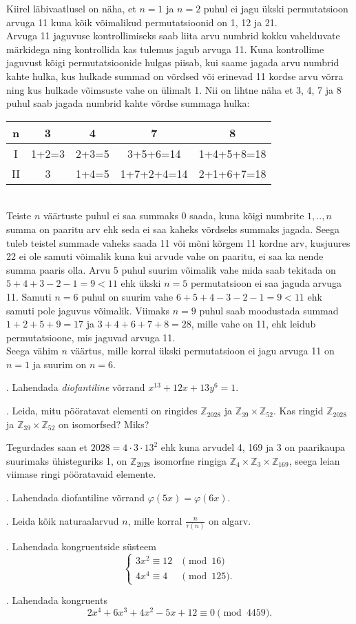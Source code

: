 \documentclass[a4paper, 10pt]{article}
\newcommand{\Z}{\mathbb{Z}}
\begin{document}
\bigskip
Kiirel läbivaatlusel on näha, et $n=1$ ja $n=2$ puhul ei jagu ükski permutatsioon arvuga 11 kuna kõik võimalikud permutatsioonid on 1, 12 ja 21.\\
Arvuga 11 jaguvuse kontrollimiseks saab liita arvu numbrid kokku vahelduvate märkidega ning kontrollida kas tulemus jagub arvuga 11. Kuna kontrollime jaguvust kõigi permutatsioonide hulgas piisab, kui saame jagada arvu numbrid kahte hulka, kus hulkade summad on võrdsed või erinevad 11 kordse arvu võrra ning kus hulkade võimsuste vahe on ülimalt 1. Nii on lihtne näha et 3, 4, 7 ja 8 puhul saab jagada numbrid kahte võrdse summaga hulka:\\
\begin{tabular}{c|c|c|c|c}
n&3&4&7&8\\
\hline
I&1+2=3&2+3=5&3+5+6=14&1+4+5+8=18\\
II&3&1+4=5&1+7+2+4=14&2+1+6+7=18
\end{tabular}\\
Teiste $n$ väärtuste puhul ei saa summaks 0 saada, kuna kõigi numbrite $1,..,n$ summa on paaritu arv ehk seda ei saa kaheks võrdseks summaks jagada. Seega tuleb teistel summade vaheks saada 11 või mõni kõrgem 11 kordne arv, kusjuures 22 ei ole samuti võimalik kuna kui arvude vahe on paaritu, ei saa ka nende summa paaris olla. Arvu 5 puhul suurim võimalik vahe mida saab tekitada on $5+4+3-2-1=9<11$ ehk ükski $n=5$ permutatsioon ei saa jaguda arvuga 11. Samuti $n=6$ puhul on suurim vahe $6+5+4-3-2-1=9<11$ ehk samuti pole jaguvus võimalik. Viimaks $n=9$ puhul saab moodustada summad $1+2+5+9=17$ ja $3+4+6+7+8=28$, mille vahe on 11, ehk leidub permutatsioone, mis jaguvad arvuga 11.\\
Seega vähim $n$ väärtus, mille korral ükski permutatsioon ei jagu arvuga 11 on $n=1$ ja suurim on $n=6$.
\bigskip

. Lahendada \emph{diofantiline} võrrand $x^{13}+12x+13y^6=1$.

\bigskip

. Leida, mitu pööratavat elementi on ringides $\Z_{2028}$ ja $\Z_{39}\times \Z_{52}$. Kas ringid $\Z_{2028}$ ja $\Z_{39}\times \Z_{52}$ on isomorfsed? Miks?

\bigskip
Tegurdades saan et $2028=4\cdot3\cdot13^2$ ehk kuna arvudel 4, 169 ja 3 on paarikaupa suurimaks ühisteguriks 1, on $\Z_{2028}$ isomorfne ringiga $\Z_4\times\Z_{3}\times\Z_{169}$, seega leian viimase ringi pööratavaid elemente. 
\bigskip

. Lahendada diofantiline võrrand $\varphi(5x) = \varphi(6x)$.


\bigskip

. Leida kõik naturaalarvud $n$, mille korral $\frac{n}{\tau(n)}$ on algarv. 

\bigskip

. Lahendada kongruentside s\"usteem 
\[
\left\{
\begin{array}{ll}
3x^2\equiv 12 & \pmod{16}\\
4x^4\equiv 4 & \pmod{125}.
\end{array}
\right.
\]

\bigskip

. Lahendada kongruents $$2x^4+6x^3+4x^2-5x+12\equiv 0 \pmod{4459}.$$ 
\end{document}
